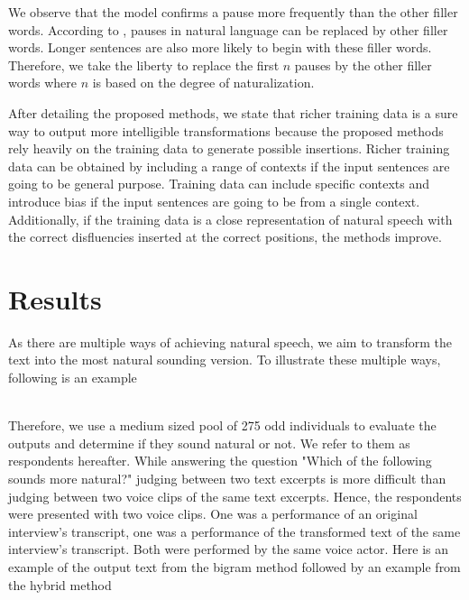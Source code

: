 \documentclass[journal]{IEEEtran}
\begin{document}
We observe that the model confirms a pause more frequently than the other filler words. According to \cite{cognitive}, pauses in natural language can be replaced by other filler words. Longer sentences are also more likely to begin with these filler words. Therefore, we take the liberty to replace the first $n$ pauses by the other filler words where $n$ is based on the degree of naturalization. 

After detailing the proposed methods, we state that richer training data is a sure way to output more intelligible transformations because the proposed methods rely heavily on the training data to generate possible insertions. Richer training data can be obtained by including a range of contexts if the input sentences are going to be general purpose. Training data can include specific contexts and introduce bias if the input sentences are going to be from a single context. Additionally, if the training data is a close representation of natural speech with the correct disfluencies inserted at the correct positions, the methods improve. 

\section{Results}

As there are multiple ways of achieving natural speech, we aim to transform the text into the most natural sounding version. To illustrate these multiple ways, following is an example

\noindent{}
\\

Therefore, we use a medium sized pool of 275 odd individuals to evaluate the outputs and determine if they sound natural or not. We refer to them as respondents hereafter. While answering the question "Which of the following sounds more natural?" judging between two text excerpts is more difficult than judging between two voice clips of the same text excerpts. Hence, the respondents were presented with two voice clips. One was a performance of an original interview's transcript, one was a performance of the transformed text of the same interview's transcript. Both were performed by the same voice actor. Here is an example of the output text from the bigram method followed by an example from the hybrid method
\end{document}
